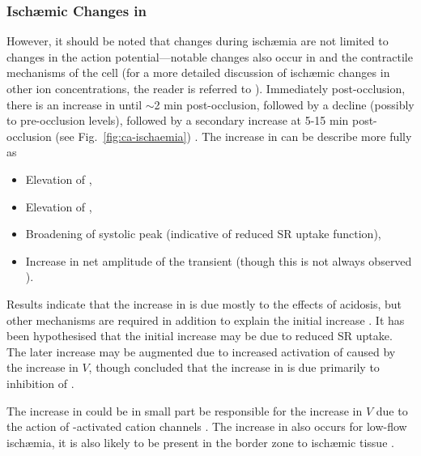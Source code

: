 \documentclass[../thesis-main.tex]{subfiles}
\begin{document}
\subsubsection{Isch\ae{}mic Changes in \cai}
\label{subsubsec:ischaemia-ca}
However, it should be noted that changes during isch\ae{}mia are not limited to changes in the action potential---notable changes also occur in \cai{} and the contractile mechanisms of the cell (for a more detailed discussion of isch\ae{}mic changes in other ion concentrations, the reader is referred to \citet{Carmeliet1999, Niederer2013}). Immediately post-occlusion, there is an increase in \cai{} until $\sim$2 min post-occlusion, followed by a decline (possibly to pre-occlusion levels), followed by a secondary increase at 5-15 min post-occlusion (see Fig.~\ref{fig:ca-ischaemia}) \citep{Lee1988, Mohabir1991, Camacho1993}. The increase in \cai{} can be describe more fully as
\begin{itemize}
 \item Elevation of \casys{},
 \item Elevation of \cadia{},
 \item Broadening of systolic \ca{} peak (indicative of reduced SR uptake function),
 \item Increase in net amplitude of the \ca{} transient (though this is not always observed \citep{Camacho1993}).
\end{itemize}
Results indicate that the increase in \cai{} is due mostly to the effects of acidosis, but other mechanisms are required in addition to explain the initial increase \citep{Bers1982, Mohabir1991}. It has been hypothesised that the initial increase may be due to reduced SR uptake. The later increase may be augmented due to increased activation of \ica{} caused by the increase in $V$, though \citet{Niederer2013} concluded that the increase in \cadia{} is due primarily to inhibition of \inak{}.

The increase in \cai{} could be in small part be responsible for the increase in $V$ due to the action of \ca{}-activated cation channels \citep{Colquhoun1981}. The increase in \cai{} also occurs for low-flow isch\ae{}mia, \idest{} it is also likely to be present in the border zone to isch\ae{}mic tissue \citep{Camacho1993}.
\end{document}
